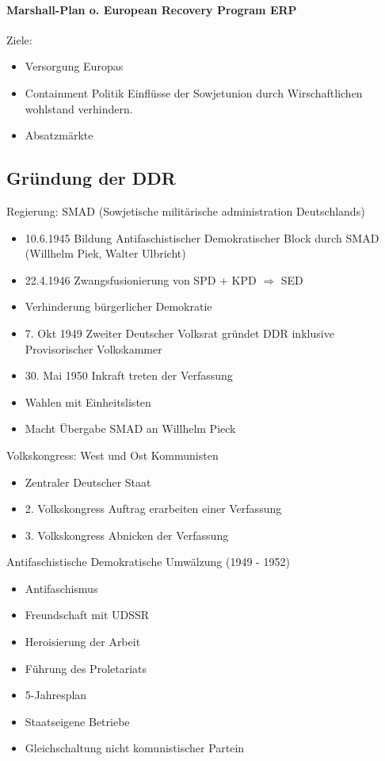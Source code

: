 \documentclass[12pt]{article}
\begin{document}
\paragraph*{Marshall-Plan o. European Recovery Program ERP}

Ziele:
\begin{itemize}
	\item Versorgung Europas
	\item Containment Politik Einflüsse der Sowjetunion durch Wirschaftlichen wohlstand verhindern.
	\item Absatzmärkte
\end{itemize}

\subsection*{Gründung der DDR}

Regierung: SMAD (Sowjetische militärische administration Deutschlands)

\begin{itemize}
	\item 10.6.1945 Bildung Antifaschistischer Demokratischer Block durch SMAD (Willhelm Piek, Walter Ulbricht)
	\item 22.4.1946 Zwangsfusionierung von SPD + KPD $\Rightarrow$ SED
	\item Verhinderung bürgerlicher Demokratie
	\item 7. Okt 1949 Zweiter Deutscher Volksrat gründet DDR inklusive Provisorischer Volkskammer
	\item 30. Mai 1950 Inkraft treten der Verfassung
	\item Wahlen mit Einheitslisten
	\item Macht Übergabe SMAD an Willhelm Pieck
\end{itemize}

Volkskongress: West und Ost Kommunisten
\begin{itemize}
	\item Zentraler Deutscher Staat
	\item 2. Volkskongress Auftrag erarbeiten einer Verfassung
	\item 3. Volkskongress Abnicken der Verfassung
\end{itemize}

Antifaschistische Demokratische Umwälzung (1949 - 1952)
\begin{itemize}
	\item  Antifaschismus
	\item Freundschaft mit UDSSR
	\item Heroisierung der Arbeit
	\item Führung des Proletariats
	\item 5-Jahresplan
	\item Staatseigene Betriebe 
	\item Gleichschaltung nicht komunistischer Partein
\end{itemize}
\end{document}
